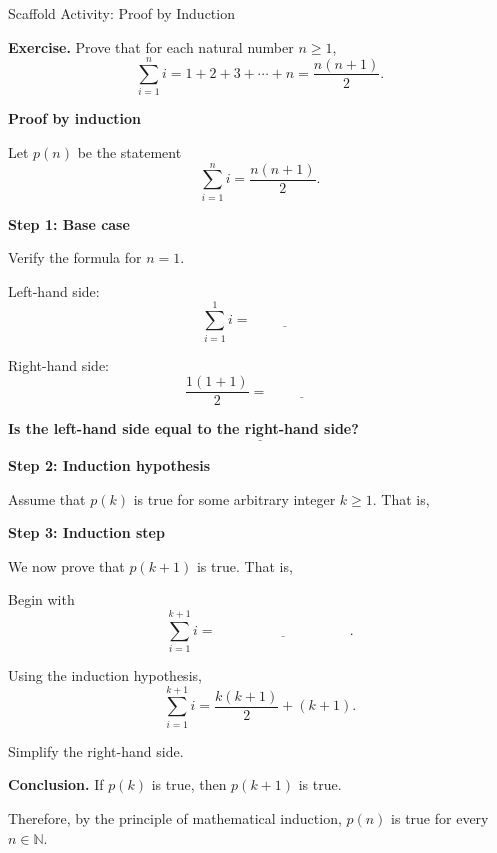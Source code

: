 \documentclass[12pt]{article}
\begin{document}
\begin{activitybox}{Scaffold Activity: Proof by Induction}

\textbf{Exercise.}
Prove that for each natural number \(n\geq 1\),
\[
    \sum_{i=1}^{n} i
    =
    1+2+3+\cdots+n
    =
    \frac{n(n+1)}{2}.
\]

\bigskip

\textbf{Proof by induction}

\medskip

Let \(p(n)\) be the statement
\[
    \sum_{i=1}^{n} i=\frac{n(n+1)}{2}.
\]

\bigskip

\textbf{Step 1: Base case}

Verify the formula for \(n=1\).

\medskip

Left-hand side:
\[
    \sum_{i=1}^{1}i=\underline{\hspace{2cm}}
\]

Right-hand side:
\[
    \frac{1(1+1)}{2}=\underline{\hspace{2cm}}
\]

\medskip

\textbf{Is the left-hand side equal to the right-hand side?}
\[
    \underline{\hspace{3cm}}
\]

\bigskip

\textbf{Step 2: Induction hypothesis}

Assume that \(p(k)\) is true for some arbitrary integer \(k\geq 1\). That is,

\vspace{2cm}

\bigskip

\textbf{Step 3: Induction step}

We now prove that \(p(k+1)\) is true. That is,

\vspace{2cm}

Begin with
\[
    \sum_{i=1}^{k+1}i
    =
    \underline{\hspace{4cm}}.
\]

Using the induction hypothesis,
\[
    \sum_{i=1}^{k+1}i
    =
    \frac{k(k+1)}{2}+(k+1).
\]

Simplify the right-hand side.

\vspace{4cm}

\textbf{Conclusion.}
If \(p(k)\) is true, then \(p(k+1)\) is true.

\medskip

Therefore, by the principle of mathematical induction, \(p(n)\) is true for every
\(n\in\mathbb{N}\).

\end{activitybox}
\newpage
\end{document}
